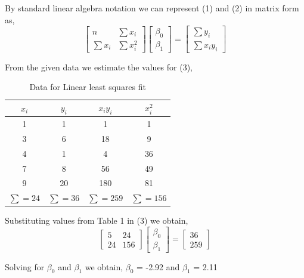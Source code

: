 \documentclass{scrartcl}
\begin{document}
By standard linear algebra notation we can represent (1) and (2) in matrix form as,\\
\begin{equation}
    \begin{bmatrix} n & \sum x_{i}\\ \sum x_{i} & \sum x_{i}^{2} \end{bmatrix}
\begin{bmatrix} \beta_{0}\\ \beta_{1} \end{bmatrix} 
= \begin{bmatrix} \sum y_{i}\\ \sum x_{i}y_i \end{bmatrix}
\end{equation}

From the given data we estimate the values for (3),\\

\begin{table}[ht]
    \centering
    \begin{tabular}{|c|c|c|c|}
    \hline
        $x_i$ & $y_i$ & $x_iy_i$ & $x_i^2$ \\ [0.5ex]
    \hline \hline
        1 & 1 & 1 & 1\\
    \hline
        3 & 6 & 18 & 9\\
    \hline
        4 & 1 & 4 & 36\\
    \hline
        7 & 8 & 56 & 49\\
    \hline
        9 & 20 & 180 & 81\\
    \hline
        $\sum=24$ & $\sum=36$ & $\sum=259$ & $\sum=156$\\ [0.5ex]
    \hline
    \end{tabular}
    \caption{Data for Linear least squares fit}
    \label{tab:linear}
\end{table}

Substituting values from Table 1 in (3) we obtain, \\
$$
 \begin{bmatrix} 5 & 24\\ 24 & 156 \end{bmatrix}
\begin{bmatrix} \beta_{0}\\ \beta_{1} \end{bmatrix} 
= \begin{bmatrix} 36\\ 259 \end{bmatrix}
$$

Solving for $\beta_{0}$ and $\beta_{1}$ we obtain,
$\beta_{0}$ = -2.92 and $\beta_{1}$ = 2.11
\end{document}

